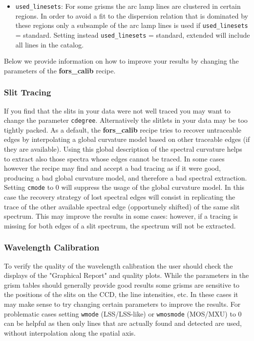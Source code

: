 \begin{enumerate}
\begin{itemize}
\item {\tt used\_linesets}: For some grisms the arc lamp lines are clustered in certain regions. In order to avoid a fit to the dispersion relation that is dominated by these regions only a subsample of the
arc lamp lines is used if {\tt used\_linesets} = standard. Setting instead {\tt used\_linesets} = standard, extended will include all lines in the catalog.

\end{itemize}
\end{enumerate}


Below we provide information on how to improve your results by changing the parameters of the {\bf fors\_calib} recipe.

\subsubsection{Slit Tracing}

If you find that the slits in your data were not well traced you may want to change the parameter {\tt cdegree}. 
Alternatively the slitlets in your data may be too tightly packed. As a default, the {\bf fors\_calib} recipe tries
to recover untraceable edges by interpolating a global curvature model based on other traceable edges (if they are available). Using this global description of the spectral curvature helps to extract also those spectra whose edges cannot be traced. In some cases however the recipe may find and accept a bad tracing as if it were good, producing a bad global curvature model, and therefore a bad spectral extraction. Setting {\tt cmode} to 0
will suppress the usage of the global curvature model. In this case the recovery strategy of lost spectral edges will consist in replicating the trace of the other available spectral edge (opportunely shifted) of the same slit spectrum. This may improve the results in some cases: however, if a tracing is missing for both edges of a slit spectrum, the spectrum will not be extracted.

\subsubsection{Wavelength Calibration}
To verify the quality of the wavelength calibration the user should check the displays of the "Graphical Report" and quality plots.
While the parameters in the grism tables should generally provide good results some grisms are sensitive to the
positions of the slits on the CCD, the line intensities, etc. In these cases it may make sense to try changing certain parameters to improve the results. For problematic cases setting {\tt wmode} (LSS/LSS-like) or {\tt wmosmode} (MOS/MXU) to 0 can be helpful as then only lines that are actually found and detected are used, without interpolation along the spatial axis.


